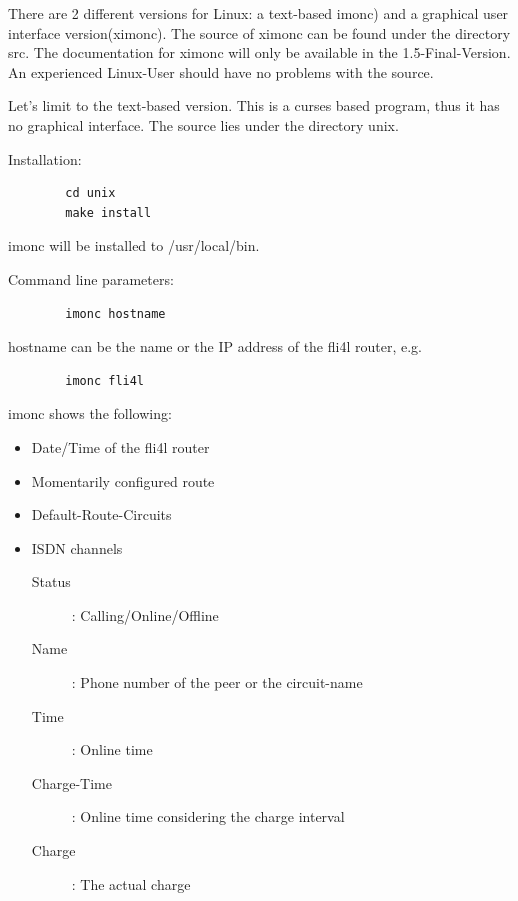   


  There are 2 different versions for Linux: a text-based imonc) and a
  graphical user interface version(ximonc). The source of ximonc can be
  found under the directory src. The documentation for ximonc will only
  be available in the 1.5-Final-Version. An experienced Linux-User should
  have no problems with the source.

  Let's limit to the text-based version.
  This is a curses based program, thus it has no graphical interface.
  The source lies under the directory unix.


  Installation:

\begin{example}
\begin{verbatim}
        cd unix
        make install
\end{verbatim}
\end{example}

  imonc will be installed to /usr/local/bin.

  Command line parameters:

\begin{example}
\begin{verbatim}
        imonc hostname
\end{verbatim}
\end{example}

  hostname can be the name or the IP address of the fli4l
  router, e.g.

\begin{example}
\begin{verbatim}
        imonc fli4l
\end{verbatim}
\end{example}


  imonc shows the following:

  \begin{itemize}
  \item Date/Time of the fli4l router

  \item Momentarily configured route

  \item Default-Route-Circuits

  \item ISDN channels
    \begin{description}
    \item[Status]:         Calling/Online/Offline
    \item[Name]:           Phone number of the peer or the circuit-name
    \item[Time]:           Online time
    \item[Charge-Time]:    Online time considering the charge interval
    \item[Charge]:         The actual charge
    \end{description}
  \end{itemize}


